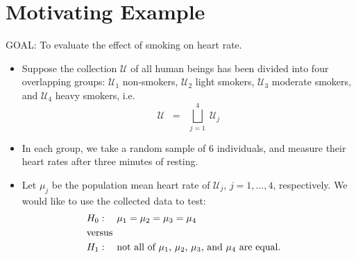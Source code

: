 \documentclass{article}
\begin{document}


\pagestyle{fancy}

%

\lfoot[]{}
\cfoot[]{}
\rfoot[]{\thepage}



\section{Motivating Example}
\setcounter{theorem}{0}

\noindent
GOAL: To evaluate the effect of smoking on heart rate.

\begin{itemize}
\item  Suppose the collection $\mathcal{U}$ of all human beings has been divided into four overlapping groups: $\mathcal{U}_{1}$ non-smokers, $\mathcal{U}_{2}$ light smokers, $\mathcal{U}_{3}$ moderate smokers, and $\mathcal{U}_{4}$ heavy smokers, i.e.
\begin{equation*}
\mathcal{U} \;\; = \;\; \bigsqcup_{j=1}^{4} \; \mathcal{U}_{j}
\end{equation*}
\item  In each group, we take a random sample of $6$ individuals, and measure their heart rates after three minutes of resting.
\item  Let $\mu_{j}$ be the population mean heart rate of $\mathcal{U}_{j}$, $j = 1, \ldots, 4$, respectively.  We would like to use the collected data to test:
\begin{eqnarray*}
&H_{0}: \quad \mu_{1} = \mu_{2} = \mu_{3} = \mu_{4} &\\
&\textnormal{versus}& \\
&H_{1}: \quad \textnormal{not all of $\mu_{1}$, $\mu_{2}$, $\mu_{3}$, and $\mu_{4}$ are equal.}&\\
\end{eqnarray*}
\end{itemize}
\end{document}
